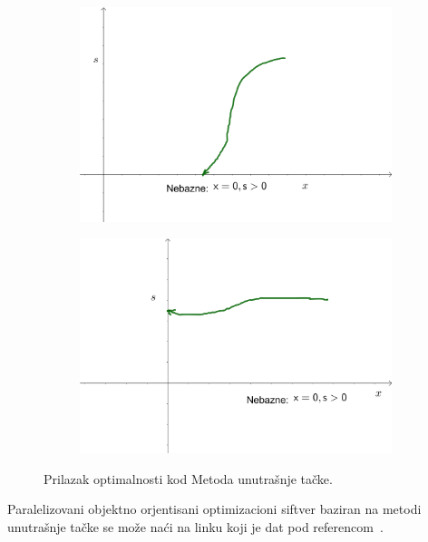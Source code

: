 \documentclass[a4paper, utf8, 11pt, colorlinks]{book}
\theoremstyle{definition}
\begin{document}
\begin{figure}
	\centering
	\begin{subfigure}{.45\textwidth}
		\centering
		\includegraphics[width=.9\linewidth]{interior-3}  
	\end{subfigure}
	\begin{subfigure}{.45\textwidth}
		\centering
		\includegraphics[width=.9\linewidth]{interior-4}  
	\end{subfigure}
	\caption{Prilazak optimalnosti kod Metoda unutrašnje tačke.}
	\label{fig:optimality-approaching-interior}
\end{figure}
Paralelizovani objektno orjentisani optimizacioni siftver baziran na metodi unutrašnje tačke se može naći na 
linku koji je dat pod referencom~\cite{cite_key25}. %
\end{document}
